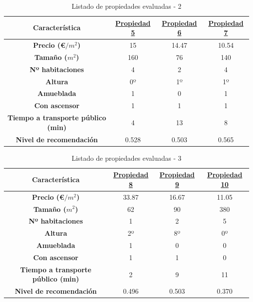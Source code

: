 \documentclass[12pt]{report} %
\begin{document}
    \begin{table}[h]
        \center
        \begin{tabular}{|c|ccc|}
            \hline
            \textbf{Característica} & \href{https://www.idealista.com/inmueble/106137531/}{Propiedad 5} & \href{https://www.idealista.com/inmueble/106355273/}{Propiedad 6} & \href{https://www.idealista.com/inmueble/106107441/}{Propiedad 7} \\
            \hline
            \hline
            \textbf{Precio (€$/m^2$)}                  & 15    & 14.47 & 10.54 \\
            \textbf{Tamaño ($m^2$)}                    & 160   & 76    & 140   \\
            \textbf{Nº habitaciones}                   & 4     & 2     & 4     \\
            \textbf{Altura}                            & 0º    & 1º    & 1º    \\
            \textbf{Amueblada\footnotemark[1]}         & 1     & 0     & 1     \\
            \textbf{Con ascensor\footnotemark[1]}      & 1     & 1     & 1     \\
            \textbf{Tiempo a transporte público (min)} & 4     & 13    & 8     \\
            \textbf{Nivel de recomendación}            & 0.528 & 0.503 & 0.565 \\
            \hline
        \end{tabular}
        \caption{Listado de propiedades evaluadas - 2}
    \end{table}
    \begin{table}[H]
        \center
        \begin{tabular}{|c|ccc|}
            \hline
            \textbf{Característica} & \href{https://www.idealista.com/inmueble/102581910/}{Propiedad 8} & \href{https://www.idealista.com/inmueble/96374938/}{Propiedad 9} & \href{https://www.idealista.com/inmueble/105316199/}{Propiedad 10} \\
            \hline
            \hline
            \textbf{Precio (€$/m^2$)}                  & 33.87 & 16.67 & 11.05 \\
            \textbf{Tamaño ($m^2$)}                    & 62    & 90    & 380   \\
            \textbf{Nº habitaciones}                   & 1     & 2     & 5     \\
            \textbf{Altura}                            & 2º    & 8º    & 0º    \\
            \textbf{Amueblada\footnotemark[1]}         & 1     & 0     & 0     \\
            \textbf{Con ascensor\footnotemark[1]}      & 1     & 1     & 0     \\
            \textbf{Tiempo a transporte público (min)} & 2     & 9     & 11    \\
            \textbf{Nivel de recomendación}            & 0.496 & 0.503 & 0.370 \\
            \hline
        \end{tabular}
        \caption{Listado de propiedades evaluadas - 3}
    \end{table}
\end{document}
